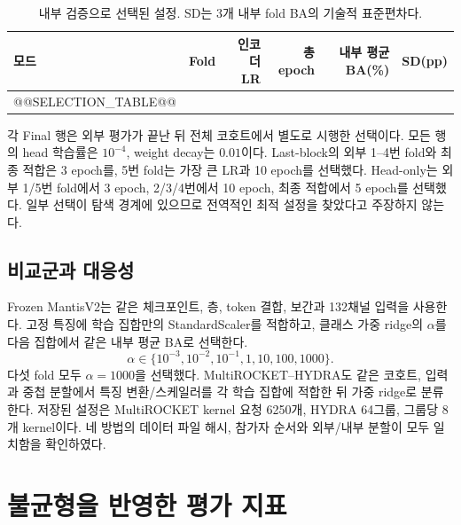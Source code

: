 \documentclass[11pt,a4paper]{article}
\begin{document}
\begin{table}[H]\centering\small
\caption{내부 검증으로 선택된 설정. SD는 3개 내부 fold BA의 기술적 표준편차다.}
\begin{tabular}{@{}llrrrr@{}}\toprule
모드 & Fold & 인코더 LR & 총 epoch & 내부 평균 BA(\%) & SD(pp)\\\midrule
@@SELECTION_TABLE@@
\bottomrule\end{tabular}
\end{table}
각 Final 행은 외부 평가가 끝난 뒤 전체 코호트에서 별도로 시행한 선택이다.
모든 행의 head 학습률은 $10^{-4}$, weight decay는 $0.01$이다.
Last-block의 외부 1--4번 fold와 최종 적합은 3 epoch를,
5번 fold는 가장 큰 LR과 10 epoch를 선택했다.
Head-only는 외부 1/5번 fold에서 3 epoch, 2/3/4번에서 10 epoch,
최종 적합에서 5 epoch를 선택했다.
일부 선택이 탐색 경계에 있으므로 전역적인 최적 설정을 찾았다고 주장하지 않는다.

\subsection{비교군과 대응성}
Frozen MantisV2는 같은 체크포인트, 층, token 결합, 보간과 132채널 입력을 사용한다.
고정 특징에 학습 집합만의 StandardScaler를 적합하고,
클래스 가중 ridge의 $\alpha$를 다음 집합에서 같은 내부 평균 BA로 선택한다.
\begin{equation*}
 \alpha\in\{10^{-3},10^{-2},10^{-1},1,10,100,1000\}.
\end{equation*}
다섯 fold 모두 $\alpha=1000$을 선택했다.
MultiROCKET--HYDRA\cite{multirocket,hydra}도 같은 코호트, 입력과 중첩 분할에서
특징 변환/스케일러를 각 학습 집합에 적합한 뒤 가중 ridge로 분류한다.
저장된 설정은 MultiROCKET kernel 요청 6250개, HYDRA 64그룹, 그룹당 8개 kernel이다.
네 방법의 데이터 파일 해시, 참가자 순서와 외부/내부 분할이 모두 일치함을 확인하였다.
\clearpage

\section{불균형을 반영한 평가 지표}
\end{document}
